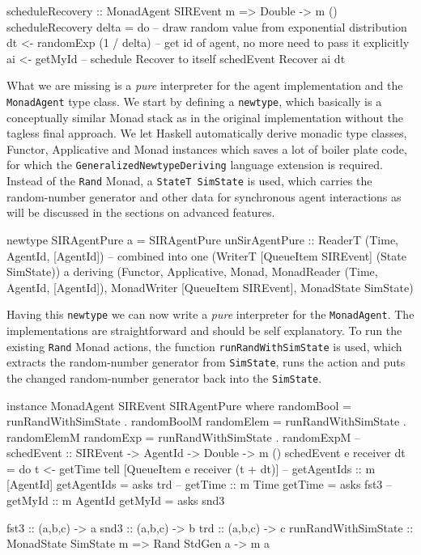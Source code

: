\begin{HaskellCode}
scheduleRecovery :: MonadAgent SIREvent m => Double -> m ()
scheduleRecovery delta = do
  -- draw random value from exponential distribution
  dt <- randomExp (1 / delta)
  -- get id of agent, no more need to pass it explicitly
  ai <- getMyId
  -- schedule Recover to itself
  schedEvent Recover ai dt
\end{HaskellCode}

What we are missing is a \textit{pure} interpreter for the agent implementation and the \texttt{MonadAgent} type class. We start by defining a \texttt{newtype}, which basically is a conceptually similar Monad stack as in the original implementation without the tagless final approach. We let Haskell automatically derive monadic type classes, Functor, Applicative and Monad instances which saves a lot of boiler plate code, for which the \texttt{GeneralizedNewtypeDeriving} language extension is required. Instead of the \texttt{Rand} Monad, a \texttt{StateT SimState} is used, which carries the random-number generator and other data  for synchronous agent interactions as will be discussed in the sections on advanced features.

\begin{HaskellCode}
newtype SIRAgentPure a = SIRAgentPure 
  { unSirAgentPure :: ReaderT (Time, AgentId, [AgentId]) -- combined into one
                        (WriterT [QueueItem SIREvent]
                          (State SimState)) a}
  deriving (Functor, Applicative, Monad, 
            MonadReader (Time, AgentId, [AgentId]),
            MonadWriter [QueueItem SIREvent],  
            MonadState SimState)
\end{HaskellCode}

Having this \texttt{newtype} we can now write a \textit{pure} interpreter for the \texttt{MonadAgent}. The implementations are straightforward and should be self explanatory. To run the existing \texttt{Rand} Monad actions, the function \texttt{runRandWithSimState} is used, which extracts the random-number generator from \texttt{SimState}, runs the action and puts the changed random-number generator back into the \texttt{SimState}.

\begin{HaskellCode}   
instance MonadAgent SIREvent SIRAgentPure where
  randomBool = runRandWithSimState . randomBoolM
  randomElem = runRandWithSimState . randomElemM
  randomExp  = runRandWithSimState . randomExpM
  -- schedEvent :: SIREvent -> AgentId -> Double -> m ()
  schedEvent e receiver dt = do
    t <- getTime 
    tell [QueueItem e receiver (t + dt)]
  -- getAgentIds :: m [AgentId]
  getAgentIds = asks trd
  -- getTime :: m Time
  getTime = asks fst3
  -- getMyId :: m AgentId
  getMyId = asks snd3

fst3 :: (a,b,c) -> a
snd3 :: (a,b,c) -> b
trd :: (a,b,c) -> c
runRandWithSimState :: MonadState SimState m => Rand StdGen a -> m a
\end{HaskellCode}

